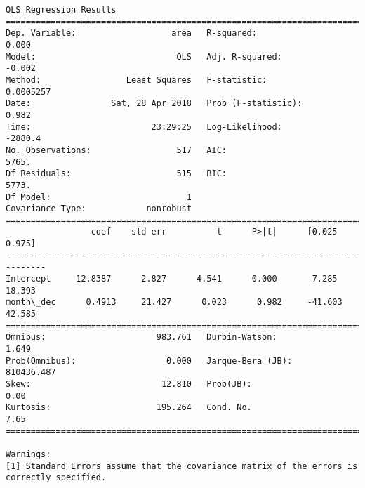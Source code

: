 \documentclass[11pt]{article}
\begin{document}
\begin{Verbatim}[commandchars=\\\{\}]
                            OLS Regression Results                            
==============================================================================
Dep. Variable:                   area   R-squared:                       0.000
Model:                            OLS   Adj. R-squared:                 -0.002
Method:                 Least Squares   F-statistic:                 0.0005257
Date:                Sat, 28 Apr 2018   Prob (F-statistic):              0.982
Time:                        23:29:25   Log-Likelihood:                -2880.4
No. Observations:                 517   AIC:                             5765.
Df Residuals:                     515   BIC:                             5773.
Df Model:                           1                                         
Covariance Type:            nonrobust                                         
==============================================================================
                 coef    std err          t      P>|t|      [0.025      0.975]
------------------------------------------------------------------------------
Intercept     12.8387      2.827      4.541      0.000       7.285      18.393
month\_dec      0.4913     21.427      0.023      0.982     -41.603      42.585
==============================================================================
Omnibus:                      983.761   Durbin-Watson:                   1.649
Prob(Omnibus):                  0.000   Jarque-Bera (JB):           810436.487
Skew:                          12.810   Prob(JB):                         0.00
Kurtosis:                     195.264   Cond. No.                         7.65
==============================================================================

Warnings:
[1] Standard Errors assume that the covariance matrix of the errors is correctly specified.



\end{Verbatim}
\end{document}
